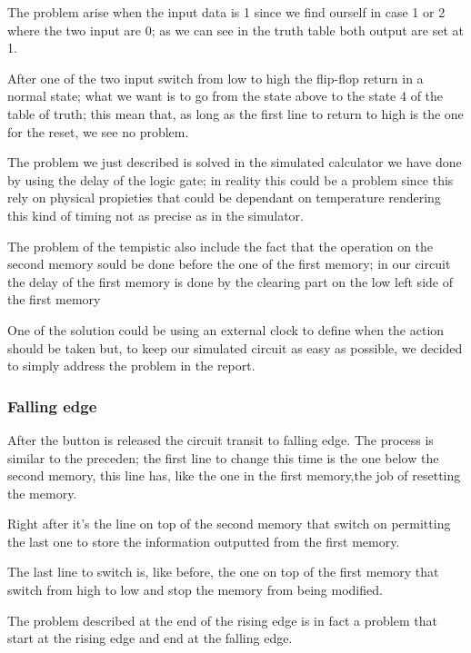 \documentclass{article}
\begin{document}
The problem arise when the input data is 1 since we find ourself in case 1 or 2 where the two input are 0; as we can see in the truth table both output are set at 1.

After one of the two input switch from low to high the flip-flop return in a normal state; what we want is to go from the state above to the state 4 of the table of truth; this mean that, as long as the first line to return to high is the one for the reset, we see no problem.

\vspace{3mm}

The problem we just described is solved in the simulated calculator we have done by using the delay of the logic gate; in reality this could be a problem since this rely on physical propieties that could be dependant on temperature rendering this kind of timing not as precise as in the simulator.

The problem of the tempistic also include the fact that the operation on the second memory sould be done before the one of the first memory; in our circuit the delay of the first memory is done by the clearing part on the low left side of the first memory

One of the solution could be using an external clock to define when the action should be taken but, to keep our simulated circuit as easy as possible, we decided to simply address the problem in the report.


\subsubsection{Falling edge}

After the button is released the circuit transit to falling edge.
The process is similar to the preceden; the first line to change this time is the one below the second memory, this line has, like the one in the first memory,the job of resetting the memory.

Right after it's the line on top of the second memory that switch on permitting the last one to store the information outputted from the first memory.

The last line to switch is, like before, the one on top of the first memory that switch from high to low and stop the memory from being modified.

\vspace{3mm}

The problem described at the end of the rising edge is in fact a problem that start at the rising edge and end at the falling edge. 
\end{document}
